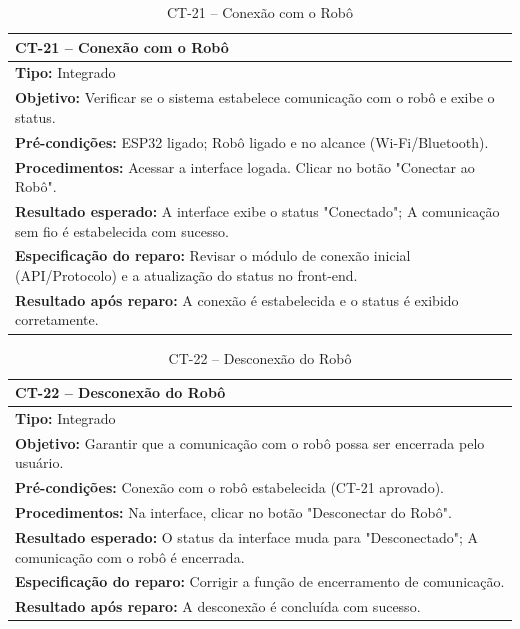 
\begin{table}[H]
\centering
\begin{tabular}{|p{}|}
\hline
\textbf{CT-21 – Conexão com o Robô} \\ \hline
\textbf{Tipo:} Integrado \\ \hline
\textbf{Objetivo:} Verificar se o sistema estabelece comunicação com o robô e exibe o status. \\ \hline
\textbf{Pré-condições:} ESP32 ligado; Robô ligado e no alcance (Wi-Fi/Bluetooth). \\ \hline
\textbf{Procedimentos:} Acessar a interface logada. Clicar no botão "Conectar ao Robô". \\ \hline
\textbf{Resultado esperado:} A interface exibe o status "Conectado"; A comunicação sem fio é estabelecida com sucesso. \\ \hline
\textbf{Especificação do reparo:} Revisar o módulo de conexão inicial (API/Protocolo) e a atualização do status no front-end. \\ \hline
\textbf{Resultado após reparo:} A conexão é estabelecida e o status é exibido corretamente. \\ \hline
\end{tabular}
\caption{CT-21 – Conexão com o Robô}
\end{table}


\begin{table}[H]
\centering
\begin{tabular}{|p{}|}
\hline
\textbf{CT-22 – Desconexão do Robô} \\ \hline
\textbf{Tipo:} Integrado \\ \hline
\textbf{Objetivo:} Garantir que a comunicação com o robô possa ser encerrada pelo usuário. \\ \hline
\textbf{Pré-condições:} Conexão com o robô estabelecida (CT-21 aprovado). \\ \hline
\textbf{Procedimentos:} Na interface, clicar no botão "Desconectar do Robô". \\ \hline
\textbf{Resultado esperado:} O status da interface muda para "Desconectado"; A comunicação com o robô é encerrada. \\ \hline
\textbf{Especificação do reparo:} Corrigir a função de encerramento de comunicação. \\ \hline
\textbf{Resultado após reparo:} A desconexão é concluída com sucesso. \\ \hline
\end{tabular}
\caption{CT-22 – Desconexão do Robô}
\end{table}

